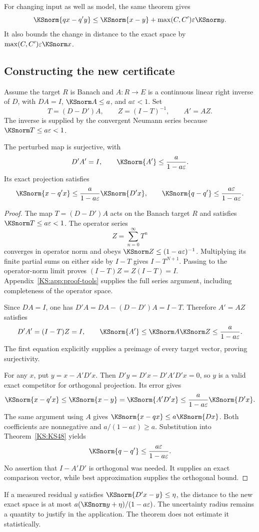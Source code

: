 For changing input as well as model, the same theorem gives
\[
 \KSnorm{qx-q'y}\le\KSnorm{x-y}+\max(C,C')\varepsilon\KSnorm y.
\]
It also bounds the change in distance to the exact space by \(\max(C,C')\varepsilon\KSnorm x\).

\subsection{Constructing the new certificate}
Assume the target \(R\) is Banach and \(A:R\to E\) is a continuous linear right inverse of \(D\), with \(DA=I\), \(\KSnorm A\le a\), and \(a\varepsilon<1\). Set
\[
 T=(D-D')A,\qquad Z=(I-T)^{-1},\qquad A'=AZ.
\]
The inverse is supplied by the convergent Neumann series because \(\KSnorm T\le a\varepsilon<1\).

\begin{KStheorem}\label{KS:KS49}
The perturbed map is surjective, with
\[
 D'A'=I,\qquad \KSnorm{A'}\le\frac{a}{1-a\varepsilon}.
\]
Its exact projection satisfies
\[
 \KSnorm{x-q'x}\le\frac{a}{1-a\varepsilon}\KSnorm{D'x},\qquad
 \KSnorm{q-q'}\le\frac{a\varepsilon}{1-a\varepsilon}.
\]
\end{KStheorem}
\begin{proof}
The map $T=(D-D')A$ acts on the Banach target $R$ and satisfies $\KSnorm T\le a\varepsilon<1$. The operator series
\[
 Z=\sum_{n=0}^\infty T^n
\]
converges in operator norm and obeys $\KSnorm Z\le(1-a\varepsilon)^{-1}$. Multiplying its finite partial sums on either side by $I-T$ gives $I-T^{N+1}$. Passing to the operator-norm limit proves $(I-T)Z=Z(I-T)=I$. Appendix~\ref{KS:app:proof-tools} supplies the full series argument, including completeness of the operator space.

Since $DA=I$, one has $D'A=DA-(D-D')A=I-T$. Therefore $A'=AZ$ satisfies
\[
 D'A'=(I-T)Z=I,\qquad
 \KSnorm{A'}\le\KSnorm A\KSnorm Z\le\frac a{1-a\varepsilon}.
\]
The first equation explicitly supplies a preimage of every target vector, proving surjectivity.

For any $x$, put $y=x-A'D'x$. Then $D'y=D'x-D'A'D'x=0$, so $y$ is a valid exact competitor for orthogonal projection. Its error gives
\[
 \KSnorm{x-q'x}\le\KSnorm{x-y}=\KSnorm{A'D'x}
 \le\frac a{1-a\varepsilon}\KSnorm{D'x}.
\]
The same argument using $A$ gives $\KSnorm{x-qx}\le a\KSnorm{Dx}$. Both coefficients are nonnegative and $a/(1-a\varepsilon)\ge a$. Substitution into Theorem~\ref{KS:KS48} yields
\[
 \KSnorm{q-q'}\le\frac{a\varepsilon}{1-a\varepsilon}.
\]
No assertion that $I-A'D'$ is orthogonal was needed. It supplies an exact comparison vector, while best approximation supplies the orthogonal bound.
\end{proof}
If a measured residual \(y\) satisfies \(\KSnorm{D'x-y}\le\eta\), the distance to the new exact space is at most \(a(\KSnorm y+\eta)/(1-a\varepsilon)\). The uncertainty radius remains a quantity to justify in the application. The theorem does not estimate it statistically.

